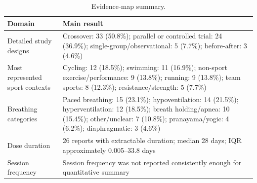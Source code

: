 \begin{table}[H]
\centering
\caption{Evidence-map summary.}
\label{tab:evidence-map}
\small
\begin{tabularx}{\textwidth}{@{}lX@{}}
\toprule
Domain & Main result \\
\midrule
Detailed study designs & Crossover: 33 (50.8\%); parallel or controlled trial: 24 (36.9\%); single-group/observational: 5 (7.7\%); before-after: 3 (4.6\%) \\
Most represented sport contexts & Cycling: 12 (18.5\%); swimming: 11 (16.9\%); non-sport exercise/performance: 9 (13.8\%); running: 9 (13.8\%); team sports: 8 (12.3\%); resistance/strength: 5 (7.7\%) \\
Breathing categories & Paced breathing: 15 (23.1\%); hypoventilation: 14 (21.5\%); hyperventilation: 12 (18.5\%); breath holding/apnea: 10 (15.4\%); other/unclear: 7 (10.8\%); pranayama/yogic: 4 (6.2\%); diaphragmatic: 3 (4.6\%) \\
Dose duration & 26 reports with extractable duration; median 28 days; IQR approximately 0.005--33.8 days \\
Session frequency & Session frequency was not reported consistently enough for quantitative summary \\
\bottomrule
\end{tabularx}
\end{table}
